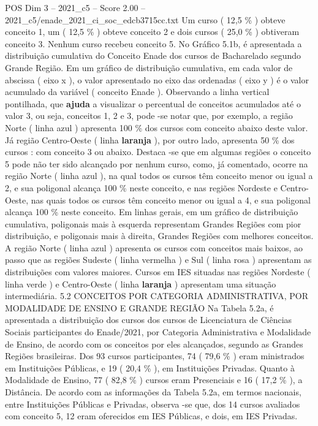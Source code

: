 \begin{textsample}{POS Dim 3 – 2021\_c5 – Score 2.00 – 2021\_c5/enade\_2021\_ci\_soc\_edcb3715cc.txt}
Um curso ( 12,5 \% ) obteve conceito 1, um ( 12,5 \% ) obteve conceito 2 e dois cursos ( 25,0 \% ) obtiveram conceito 3.
Nenhum curso recebeu conceito 5.
No Gráfico 5.1b, é apresentada a distribuição cumulativa do Conceito Enade dos cursos de Bacharelado segundo Grande Região.
Em um gráfico de distribuição cumulativa, em cada valor de abscissa ( eixo x ), o valor apresentado no eixo das ordenadas ( eixo y ) é o valor acumulado da variável ( conceito Enade ).
Observando a linha vertical pontilhada, que \textbf{ajuda} a visualizar o percentual de conceitos acumulados até o valor 3, ou seja, conceitos 1, 2 e 3, pode -se notar que, por exemplo, a região Norte ( linha azul ) apresenta 100 \% dos cursos com conceito abaixo deste valor.
Já região Centro-Oeste ( linha \textbf{laranja} ), por outro lado, apresenta 50 \% dos cursos : com conceito 3 ou abaixo.
Destaca -se que em algumas regiões o conceito 5 pode não ter sido alcançado por nenhum curso, como, já comentado, ocorre na região Norte ( linha azul ), na qual todos os cursos têm conceito menor ou igual a 2, e sua poligonal alcança 100 \% neste conceito, e nas regiões Nordeste e Centro-Oeste, nas quais todos os cursos têm conceito menor ou igual a 4, e sua poligonal alcança 100 \% neste conceito.
Em linhas gerais, em um gráfico de distribuição cumulativa, poligonais mais à esquerda representam Grandes Regiões com pior distribuição, e poligonais mais à direita, Grandes Regiões com melhores conceitos.
A região Norte ( linha azul ) apresenta os cursos com conceitos mais baixos, ao passo que as regiões Sudeste ( linha vermelha ) e Sul ( linha rosa ) apresentam as distribuições com valores maiores.
Cursos em IES situadas nas regiões Nordeste ( linha verde ) e Centro-Oeste ( linha \textbf{laranja} ) apresentam uma situação intermediária. 5.2 CONCEITOS POR CATEGORIA ADMINISTRATIVA, POR MODALIDADE DE ENSINO E GRANDE REGIÃO Na Tabela 5.2a, é apresentada a distribuição dos cursos dos cursos de Licenciatura de Ciências Sociais participantes do Enade/2021, por Categoria Administrativa e Modalidade de Ensino, de acordo com os conceitos por eles alcançados, segundo as Grandes Regiões brasileiras.
Dos 93 cursos participantes, 74 ( 79,6 \% ) eram ministrados em Instituições Públicas, e 19 ( 20,4 \% ), em Instituições Privadas.
Quanto à Modalidade de Ensino, 77 ( 82,8 \% ) cursos eram Presenciais e 16 ( 17,2 \% ), a Distância.
De acordo com as informações da Tabela 5.2a, em termos nacionais, entre Instituições Públicas e Privadas, observa -se que, dos 14 cursos avaliados com conceito 5, 12 eram oferecidos em IES Públicas, e dois, em IES Privadas.

\end{textsample}
